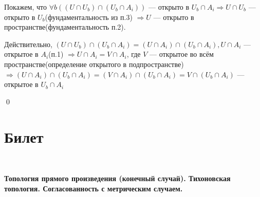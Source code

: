 \documentclass[a4paper,100pt]{article}
\theoremstyle{indented}
\begin{document}
            Покажем, что $\forall b \left((U \cap U_b) \cap (U_b \cap A_i)\right)$ --- открыто в $U_b \cap A_i \Rightarrow U \cap U_b$ --- открыто в $U_b$(фундаментальность из п.3) $\Rightarrow U$ --- открыто в пространстве(фундаментальность п.2).
            
            Действительно, $(U \cap U_b) \cap (U_b \cap A_i) = (U \cap A_i) \cap (U_b \cap A_i), U \cap A_i$ --- открытое в $A_i$(п.1) $\Rightarrow U \cap A_i = V \cap A_i$, где $V$ --- открытое во всём пространстве(определение открытого в подпространстве) $\Rightarrow(U \cap A_i) \cap (U_b \cap A_i) = (V \cap A_i) \cap (U_b \cap A_i) = V \cap (U_b \cap A_i)$ --- открытое в $U_b \cap A_i$
    
    \qed

\section{Билет} \

\medskip

\textbf{Топология прямого произведения (конечный случай). Тихоновская топология. Согласованность с метрическим случаем.}\\
\end{document}
